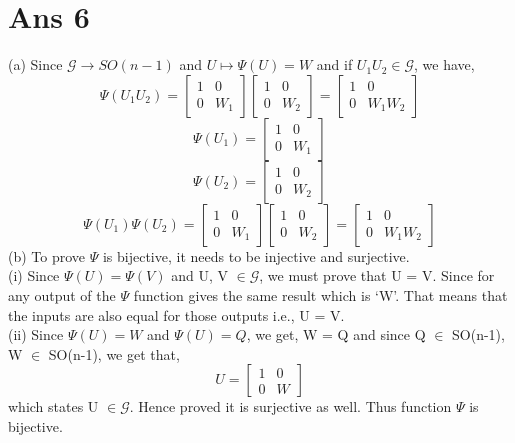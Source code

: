 \documentclass[10pt]{article}
\begin{document}
\section*{Ans 6}
\begin{flushleft}
(a) Since $\mathcal{G} \longrightarrow SO(n-1)$ and $U \longmapsto \Psi(U) = W$ and if $U_{1}U_{2} \in \mathcal{G}$, we have,\\
\vspace{0.5em}
$$
\Psi(U_{1} U_{2})= 
\begin{bmatrix}
    1 & 0 \\
    0 & W_{1}
\end{bmatrix}
\begin{bmatrix}
    1 & 0 \\
    0 & W_{2}
\end{bmatrix}
= 
\begin{bmatrix}
    1 & 0 \\
    0 & W_{1}W_{2}
\end{bmatrix}
$$
$$
\Psi(U_{1}) = 
\begin{bmatrix}
    1 & 0 \\
    0 & W_{1}
\end{bmatrix}
$$
$$
\Psi(U_{2}) = 
\begin{bmatrix}
    1 & 0 \\
    0 & W_{2}
\end{bmatrix}
$$
$$
\Psi(U_{1}) \Psi(U_{2}) =
\begin{bmatrix}
    1 & 0 \\
    0 & W_{1}
\end{bmatrix}
\begin{bmatrix}
    1 & 0 \\
    0 & W_{2}
\end{bmatrix}
= 
\begin{bmatrix}
    1 & 0 \\
    0 & W_{1}W_{2}
\end{bmatrix}
$$
(b) To prove $\Psi$ is bijective, it needs to be injective and surjective.\\
\vspace{0.5em}
(i) Since $\Psi(U) = \Psi(V)$ and U, V $\in \mathcal{G}$, we must prove that U = V. Since for any output  of the $\Psi$ function gives the same result which is `W'. That means that the inputs are also equal for those outputs i.e., U = V.\\
\vspace{0.5em}
(ii) Since $\Psi(U) = W$ and $\Psi(U) = Q$, we get, W = Q and since Q $\in$ SO(n-1), W $\in$ SO(n-1), we get that,\\ 
$$
U =
\begin{bmatrix}
    1 & 0 \\
    0 & W
\end{bmatrix}
$$
which states U $\in \mathcal{G}$. Hence proved it is surjective as well. Thus function $\Psi$ is bijective.
\end{flushleft}
\end{document}
